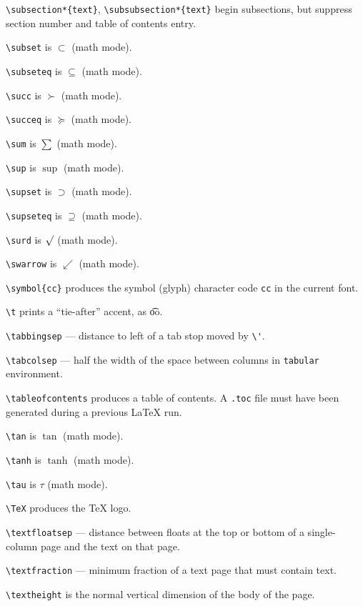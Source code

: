 \verb"\subsection*{text}", \verb"\subsubsection*{text}" begin subsections,
	but suppress section number and table of contents entry.

\verb"\subset" is $\subset$ (math mode).

\verb"\subseteq" is $\subseteq$ (math mode).

\verb"\succ" is $\succ$ (math mode).

\verb"\succeq" is $\succeq$ (math mode).

\verb"\sum" is $\sum$ (math mode).

\verb"\sup" is $\sup$ (math mode).

\verb"\supset" is $\supset$ (math mode).

\verb"\supseteq" is $\supseteq$ (math mode).

\verb"\surd" is $\surd$ (math mode).

\verb"\swarrow" is $\swarrow$ (math mode).

\verb"\symbol{cc}" produces the symbol (glyph) character code \verb"cc"
	in the current font.

\verb"\t" prints a ``tie-after'' accent, as \t oo.

\verb"\tabbingsep" --- distance to left of a tab stop moved by \verb"\'".

\verb"\tabcolsep" --- half the width of the space between columns in
	\verb"tabular" environment.

\verb"\tableofcontents" produces a table of contents. A \verb".toc" file
	must have been generated during a previous \LaTeX{} run.

\verb"\tan" is $\tan$ (math mode).

\verb"\tanh" is $\tanh$ (math mode).

\verb"\tau" is $\tau$ (math mode).

\verb"\TeX" produces the \TeX{} logo.

\verb"\textfloatsep" --- distance between floats at the top
	or bottom of a single-column page and the text on that page.

\verb"\textfraction" --- minimum fraction of a text page that must contain text.

\verb"\textheight" is the normal vertical dimension of the body of the page.

